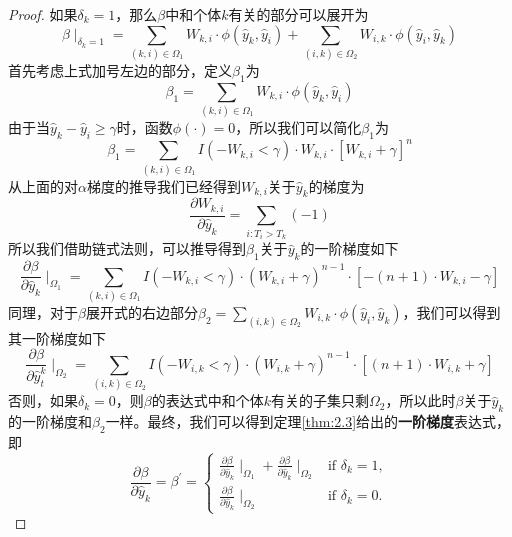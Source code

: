 \begin{proof}
如果$\delta_k = 1$，那么$\beta$中和个体$k$有关的部分可以展开为$$\beta \mid_{\delta_k=1}=\sum_{(k,i)\in \Omega_1} W_{k,i}\cdot \phi(\hat{y}_k, \hat{y}_i) + \sum_{(i,k)\in \Omega_2} W_{i,k}\cdot \phi(\hat{y}_i, \hat{y}_k) $$ 首先考虑上式加号左边的部分，定义$\beta_1$为$$\beta_1 = \sum_{(k,i)\in \Omega_1} W_{k,i}\cdot \phi(\hat{y}_k, \hat{y}_i)$$ 由于当$\hat{y}_k - \hat{y}_i \ge \gamma$时，函数$\phi(\cdot)=0$，所以我们可以简化$\beta_1$为$$\beta_1 = \sum_{(k,i)\in \Omega_1} I(-W_{k,i} < \gamma) \cdot W_{k,i}\cdot [W_{k,i} + \gamma]^n $$ 从上面的对$\alpha$梯度的推导我们已经得到$W_{k,i}$关于$\hat{y}_k$的梯度为$$\frac{\partial W_{k,i}}{\partial \hat{y}_k} = \sum\limits_{i: T_i>T_k}(-1)$$ 所以我们借助链式法则，可以推导得到$\beta_1$关于$\hat{y}_k$的一阶梯度如下$$
\frac{\partial \beta}{\partial \hat{y}_k} \mid_{\Omega_1} = \sum\limits_{(k,i)\in \Omega_1} {I(-W_{k,i}<\gamma)\cdot (W_{k,i}+\gamma)^{n-1}\cdot [-(n+1)\cdot W_{k,i}-\gamma]}
$$ 同理，对于$\beta$展开式的右边部分$\beta_2=\sum_{(i,k)\in \Omega_2} W_{i,k}\cdot \phi(\hat{y}_i, \hat{y}_k)$，我们可以得到其一阶梯度如下$$
\frac{\partial \beta}{\partial \hat{y}_t^k} \mid_{\Omega_2} = \sum\limits_{(i,k)\in \Omega_2} {I(-W_{i,k}<\gamma)\cdot (W_{i,k}+\gamma)^{n-1}\cdot [(n+1)\cdot W_{i,k}+\gamma]}
$$ 否则，如果$\delta_k = 0$，则$\beta$的表达式中和个体$k$有关的子集只剩$\Omega_2$，所以此时$\beta$关于$\hat{y}_k$的一阶梯度和$\beta_2$一样。最终，我们可以得到定理\ref{thm:2.3}给出的\textbf{一阶梯度}表达式，即$$
\frac{\partial \beta}{\partial \hat{y}_k}=\beta^{'}=
\begin{cases}
\frac{\partial \beta}{\partial \hat{y}_k} \mid_{\Omega_1} + \frac{\partial \beta}{\partial \hat{y}_k} \mid_{\Omega_2} & \text{if } \delta_k = 1,\\
\frac{\partial \beta}{\partial \hat{y}_k} \mid_{\Omega_2} & \text{if } \delta_k = 0.
\end{cases}
$$


\end{proof}
